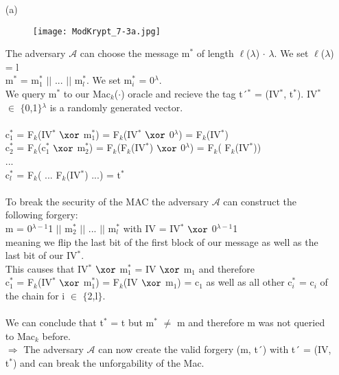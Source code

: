 \begin{itemize}
\item[(a)]

\begin{figure}[h]
    \texttt{[image: ModKrypt\_7-3a.jpg]}
    \centering
\end{figure}


The adversary \(\mathcal{A}\) can choose the message m\(^{*}\) of length \(\ell\)(\(\lambda\)) \(\cdot\) \(\lambda\). We set \(\ell\)(\(\lambda\)) = l \\
m\(^{*}\) =  m\(_{1}^{*}\) \(\vert \vert\) ...  \(\vert \vert\)  m\(_{l}^{*}\). We set m\(_{i}^{*}\) =  0\(^{\lambda}\). \\
We query m\(^{*}\) to our Mac\(_{k}\)(\(\cdot\)) oracle and recieve the tag t´\(^{*}\) = (IV\(^{*}\), t\(^{*}\)). IV\(^{*}\) \(\in\) \(\{\)0,1\(\}\)\(^{\lambda}\) is a randomly generated vector.\\
\\
c\(_{1}^{*}\) = F\(_{k}\)(IV\(^{*}\) \(\xor\) m\(_{1}^{*}\)) =  F\(_{k}\)(IV\(^{*}\) \(\xor\) 0\(^{\lambda}\)) = F\(_{k}\)(IV\(^{*}\)) \\
c\(_{2}^{*}\) = F\(_{k}\)(c\(_{1}^{*}\) \(\xor\) m\(_{2}^{*}\)) =  F\(_{k}\)(F\(_{k}\)(IV\(^{*}\)) \(\xor\) 0\(^{\lambda}\)) = F\(_{k}\)( F\(_{k}\)(IV\(^{*}\))) \\
... \\
c\(_{l}^{*}\) = F\(_{k}\)( ... F\(_{k}\)(IV\(^{*}\)) ...) = t\(^{*}\) \\
\\
To break the security of the MAC the adversary \(\mathcal{A}\) can construct the following forgery: \\
m = 0\(^{\lambda-1}\)1 \(\vert \vert\) m\(_{2}^{*}\) \(\vert \vert\) ...  \(\vert \vert\)  m\(_{l}^{*}\)
with IV = IV\(^{*}\) \(\xor\) 0\(^{\lambda-1}\)1 \\
meaning we flip the last bit of the first block of our message as well as the last bit of our IV\(^{*}\).\\
This causes that IV\(^{*}\) \(\xor\) m\(_{1}^{*}\) = IV \(\xor\) m\(_{1}\) and therefore \\ c\(_{1}^{*}\) = F\(_{k}\)(IV\(^{*}\) \(\xor\) m\(_{1}^{*}\)) =  F\(_{k}\)(IV \(\xor\) m\(_{1}\)) = c\(_{1}\) as well as all other c\(_{i}^{*}\) = c\(_{i}\) of the chain for i \(\in\) \(\{\)2,l\(\}\).\\
\\
We can conclude that t\(^{*}\) = t but m\(^{*}\) \(\neq\) m and therefore m was not queried to Mac\(_{k}\) before. \\
\(\Rightarrow\) The adversary \(\mathcal{A}\) can now create the valid forgery (m, t´) with t´ = (IV, t\(^{*}\)) and can break the unforgability of the Mac.


\end{itemize}
